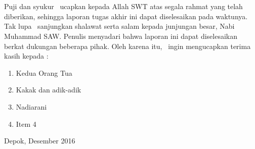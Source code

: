 \chapter*{\kataPengantar}

Puji dan syukur \saya~ucapkan kepada Allah SWT atas segala rahmat yang telah diberikan, sehingga laporan tugas akhir ini dapat diselesaikan pada waktunya. Tak lupa \saya~sanjungkan shalawat serta salam kepada junjungan besar, Nabi Muhammad SAW. Penulis menyadari bahwa laporan ini dapat diselesaikan berkat dukungan beberapa pihak. Oleh karena itu, \saya~ingin mengucapkan terima kasih kepada :

\begin{enumerate}
	\item Kedua Orang Tua \saya
	\item Kakak dan adik-adik \saya
	\item Nadiarani
	\item Item 4
	
\end{enumerate}
\vspace*{0.1cm}
\begin{flushright}
	Depok, Desember 2016\\[0.1cm]
	\vspace*{1cm}
	\penulis
	
\end{flushright}